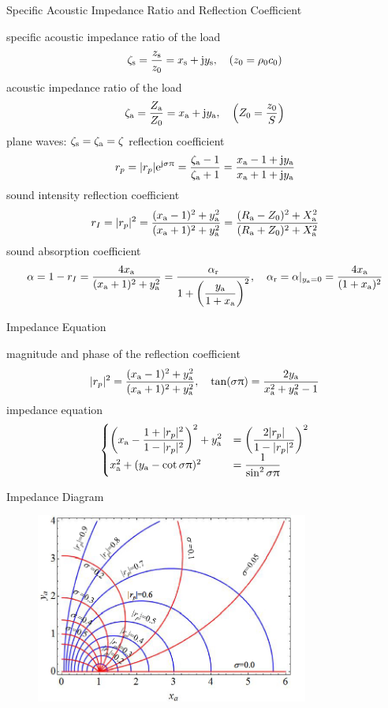 \documentclass[9pt,mathserif]{beamer}
\begin{document}
\begin{frame}{Specific Acoustic Impedance Ratio and Reflection Coefficient}
	\begin{outline}
		\1 specific acoustic impedance ratio of the load
		$$\zeta\st{s} = \frac{z\st{s}}{z_0} = x\st{s} +\mj y\st{s}\qc(z_0 = \rho_0
		c_0)$$
		\1 acoustic impedance ratio of the load
		$$\zeta\st{a} = \frac{Z\st{a}}{Z_0} = x\st{a} +\mj y\st{a}\qc
		\qty(Z_0 = \frac{z_0}{S})$$
		\1 plane waves: $\zeta_\text{s}=\zeta_\text{a}=\zeta$
		\1 reflection coefficient 
		$$r_p = |r_p| \mathrm{e}^{\mathrm{j} \sigma \uppi} =
		\frac{\zeta_\text{a}-1}{\zeta_\text{a}+1} = \frac{x_\text{a}-1+\mathrm{j} y_\text{a}}
		{x_\text{a}+1+\mathrm{j} y_\text{a}}$$
		\1 sound intensity reflection coefficient
		$$r_I = |r_p|^2 = \frac{(x_\text{a}-1)^2 +y_\text{a}^2}{(x_\text{a}+1)^2+y_\text{a}^2}
		=\frac{(R_\text{a}-Z_0)^2+X_\text{a}^2}{(R_\text{a}+Z_0)^2+X_\text{a}^2}
		$$
		\1 sound absorption coefficient
		$$\alpha = 1-r_I = \frac{4x\st{a}}{(x\st{a}+1)^2+y\st{a}^2}
		=\frac{\alpha\st{r}}{1+\qty(\dfrac{y\st{a}}{1+x\st{a}})^2}
		\qc \alpha\st{r} = \alpha|_{y\st{a}=0} = \frac{4x\st{a}}{(1+x\st{a})^2}
		$$
	\end{outline}
\end{frame}

\begin{frame}{Impedance Equation}
	\begin{outline}
		\1 magnitude and phase of the reflection coefficient 
		$$|r_p|^2 = \frac{(x\st{a}-1)^2 +y\st{a}^2 }{(x\st{a}+1)^2+y\st{a}^2}
		\qc 
		\tan (\sigma\uppi) = \frac{2 y\st{a}}{x\st{a}^2+y\st{a}^2-1}
		$$
		\1 impedance equation
		$$
		\begin{cases}
			\displaystyle
			\qty(x_\text{a}-\frac{1+|r_p|^2}{1-|r_p|^2})^2+y_\text{a}^2
			&=\qty(\dfrac{2|r_p|}{1-|r_p|^2})^2\\
			x_\text{a}^2 + (y_\text{a}-\cot \sigma \uppi)^2 &= \dfrac{1}{\sin^2 \sigma
			\uppi}
		\end{cases}
		$$
	\end{outline}
\end{frame}

\begin{frame}{Impedance Diagram}
	\begin{figure}
		\centering
		\includegraphics[width = 0.8\textwidth]{img/duct/impedanceDiagram.jpg}
	\end{figure}
\end{frame}
\end{document}
